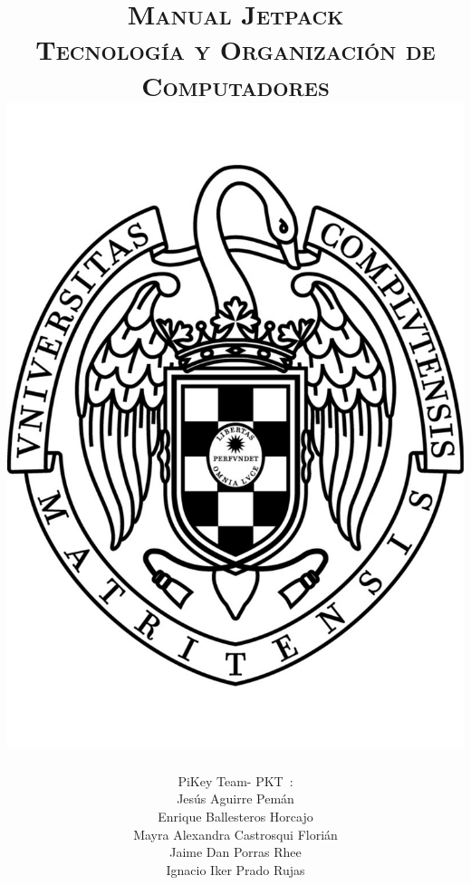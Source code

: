 \documentclass[11pt, a4paper, spanish, openright, twoside]{book}
\newcommand*{\PKT}{\hbox{P}\kern-2.5pt\lower3.5pt\hbox{\small{K}}\kern-2.8pt\hbox{T}\kern-2pt}	%
\begin{document}
 
\title{\Huge{\textsc{Manual Jetpack}} \\
	\vspace{0.7cm}
	 \textsc{\Large{Tecnología y Organización de Computadores}} \\
	\includegraphics[scale=0.3]{ucm.pdf}}
\author{\Large{PiKey Team-} \PKT \ : \vspace{0.2cm} \\
	Jesús Aguirre Pemán \\
	 Enrique Ballesteros Horcajo \\
	 Mayra Alexandra Castrosqui Florián\\
	 Jaime Dan Porras Rhee \\
	 Ignacio Iker Prado Rujas}
\date{\Today}
\maketitle
\end{document}
